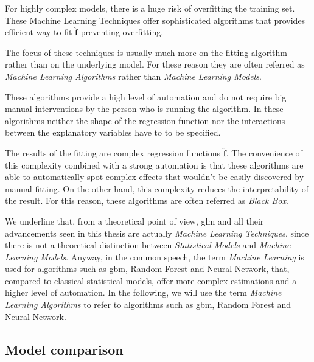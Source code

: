\documentclass[a4paper, twoside, openright, 12pt]{report}
\theoremstyle{definition}
\theoremstyle{definition}
\theoremstyle{definition}
\theoremstyle{remark}
\begin{document}
For highly complex models, there is a huge risk of overfitting the training set. These Machine Learning Techniques offer sophisticated algorithms that provides efficient way to fit \(\hat{\boldsymbol{f}}\) preventing overfitting.

The focus of these techniques is usually much more on the fitting algorithm rather than on the underlying model. For these reason they are often referred as \emph{Machine Learning Algorithms} rather than \emph{Machine Learning Models}.

These algorithms provide a high level of automation and do not require big manual interventions by the person who is running the algorithm. In these algorithms neither the shape of the regression function nor the interactions between the explanatory variables have to to be specified.

The results of the fitting are complex regression functions \(\hat{\boldsymbol{f}}\). The convenience of this complexity combined with a strong automation is that these algorithms are able to automatically spot complex effects that wouldn't be easily discovered by manual fitting. On the other hand, this complexity reduces the interpretability of the result. For this reason, these algorithms are often referred as \emph{Black Box}.

We underline that, from a theoretical point of view, \ac{glm} and all their advancements seen in this thesis are actually \emph{Machine Learning Techniques}, since there is not a theoretical distinction between \emph{Statistical Models} and \emph{Machine Learning Models}. Anyway, in the common speech, the term \emph{Machine Learning} is used for algorithms such as \ac{gbm}, Random Forest and Neural Network, that, compared to classical statistical models, offer more complex estimations and a higher level of automation. In the following, we will use the term \emph{Machine Learning Algorithms} to refer to algorithms such as \ac{gbm}, Random Forest and Neural Network.

\hypertarget{chap:model-comparison}{%
\subsection{Model comparison}\label{chap:model-comparison}}
\end{document}
